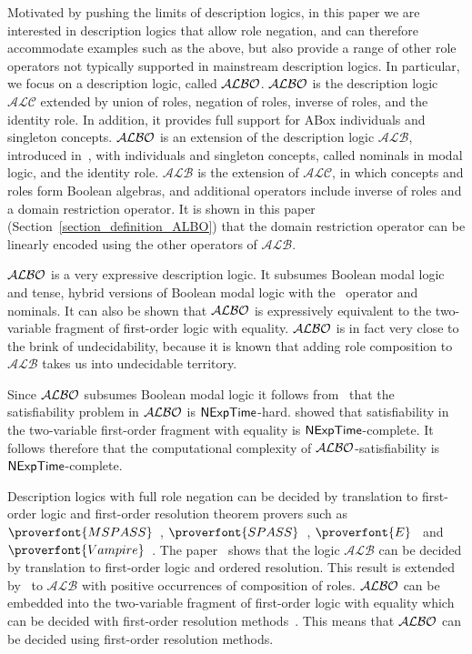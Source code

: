 \documentclass[leqno
,pdflatex
,prodmode
,acmtocl
]{acmsmall}
\newcommand{\mathcmd}[1]{\ensuremath{#1}\xspace}
\newcommand{\dlfont}{\mathcal}
\newcommand{\dl}[1]{\mathcmd{\dlfont{#1}}}
\newcommand{\ALBOid}{\dl{ALBO\smash[t]{\mbox{}}}}
\newcommand{\ALC}{\dl{ALC}}
\newcommand{\ALB}{\dl{ALB}}
\def\complexityfont{\sffamily\upshape}
\def\complexity#1{\mathcmd{\text{\complexityfont #1}}}
\def\NExpTime{\complexity{NExpTime}}
\newcommand{\spass}{\mathcmd{\proverfont{SPASS}}}
\newcommand{\mspass}{\mathcmd{\proverfont{MSPASS}}}
\newcommand{\vampire}{\mathcmd{\proverfont{Vampire}}}
\newcommand{\E}{\mathcmd{\proverfont{E}}}
\begin{document}
Motivated by pushing the limits of description logics, in this paper
we are interested in description logics that
allow role negation, and can therefore accommodate examples such as the
above,
but also provide a range of other role operators not typically
supported in mainstream description logics.
In particular, we focus on a description logic, called \ALBOid.
\ALBOid is the description logic \ALC extended by union
of roles, negation of roles, inverse of roles, and the identity role.
In addition, it provides full support for ABox individuals and singleton
concepts.
\ALBOid is an extension of the description logic
\ALB, introduced in~\cite{HustadtSchmidt00a}, with individuals and singleton concepts,
called nominals in modal logic, and the identity role.
\ALB is the extension of \ALC, in which concepts and roles form
Boolean algebras, and additional operators include inverse of roles
and a domain restriction operator.
It is shown in this paper (Section~\ref{section_definition_ALBO})
that the domain restriction operator
can be linearly encoded using the other operators of \ALB.

\ALBOid is a very expressive description logic.
It subsumes Boolean modal
logic~\cite{GargovPassy90,GargovPassyTinchev87} and tense, hybrid
versions of Boolean modal logic with the ~operator and
nominals.
It can also be shown that \ALBOid is expressively
equivalent to the two-variable fragment of first-order
logic with equality. \ALBOid is in fact very close to the brink of undecidability, because
it is known that adding role composition to \ALB
takes us into undecidable territory.

Since \ALBOid subsumes Boolean modal logic it follows
from~ that the satisfiability problem in \ALBOid
is \NExpTime-hard.
 showed that satisfiability in the
two-variable first-order fragment with equality is \NExpTime-complete.
It follows therefore that the computational complexity of
\ALBOid-satisfiability is \NExpTime-complete.

Description logics with full role negation can
be decided by translation to first-order logic and first-order
resolution theorem provers such as \mspass~\cite{HustadtSchmidtWeidenbach99}, 
\spass~\cite{WeidenbachSchmidtEtAl07}, \E~\cite{Schulz02} and
\vampire~\cite{RiazanovVoronkov99}.
The paper~\cite{HustadtSchmidt00a} shows that the logic \ALB can be
decided by translation to first-order logic and ordered resolution.
This result is extended by~ to \ALB
with positive occurrences of composition of roles.
\ALBOid can be embedded into the two-variable fragment of first-order
logic with equality which can be decided with first-order resolution
methods~\cite{DeNivellePrattHartmann01}.
This means that \ALBOid can be decided using first-order
resolution methods.
\end{document}
